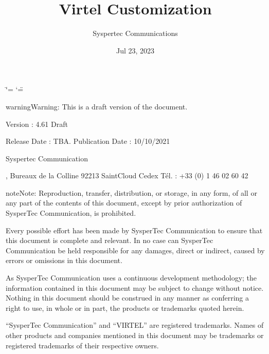 \documentclass[letterpaper,10pt,english]{sphinxmanual}
\title{Virtel Customization}
\date{Jul 23, 2023}
\author{Syspertec Communications}
\begin{document}
\ifdefined\shorthandoff
  \ifnum\catcode`\=\string=\active\shorthandoff{=}\fi
  \ifnum\catcode`\"=\active{}\fi
\fi

\pagestyle{empty}
\sphinxmaketitle
\pagestyle{plain}
\sphinxtableofcontents
\pagestyle{normal}
\label{\detokenize{Customization::doc}}


\sphinxAtStartPar
{}

\sphinxAtStartPar
{}

\begin{sphinxadmonition}{warning}{Warning:}
\sphinxAtStartPar
This is a draft version of the document.
\end{sphinxadmonition}

\sphinxAtStartPar
Version : 4.61 Draft

\sphinxAtStartPar
Release Date : TBA. Publication Date : 10/10/2021

\sphinxAtStartPar
Syspertec Communication

, Bureaux de la Colline 92213 Saint\sphinxhyphen{}Cloud Cedex Tél. : +33 (0) 1 46 02 60 42

\sphinxAtStartPar
{}

\begin{sphinxadmonition}{note}{Note:}
\sphinxAtStartPar
Reproduction, transfer, distribution, or storage, in any form, of all or any part of
the contents of this document, except by prior authorization of SysperTec
Communication, is prohibited.

\sphinxAtStartPar
Every possible effort has been made by SysperTec Communication to ensure that this document
is complete and relevant. In no case can SysperTec Communication be held responsible for
any damages, direct or indirect, caused by errors or omissions in this document.

\sphinxAtStartPar
As SysperTec Communication uses a continuous development methodology; the information
contained in this document may be subject to change without notice. Nothing in this
document should be construed in any manner as conferring a right to use, in whole or in
part, the products or trademarks quoted herein.

\sphinxAtStartPar
“SysperTec Communication” and “VIRTEL” are registered trademarks. Names of other products
and companies mentioned in this document may be trademarks or registered trademarks of
their respective owners.
\end{sphinxadmonition}
\end{document}
